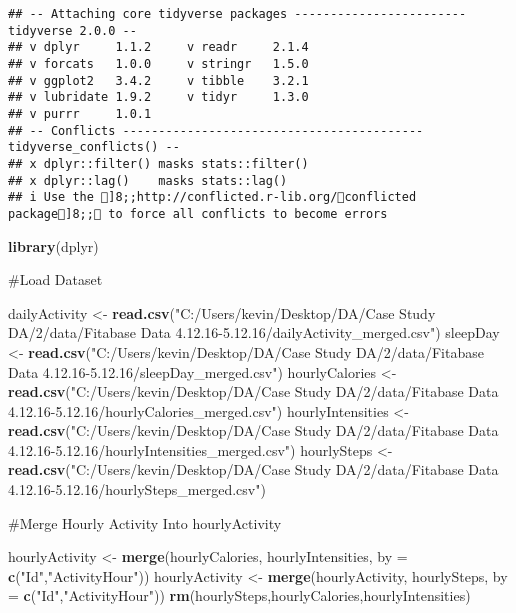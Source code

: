 \documentclass[
]{article}
\newenvironment{Shaded}{\begin{snugshade}}{\end{snugshade}}
\newcommand{\AttributeTok}[1]{\textcolor[rgb]{0.13,0.29,0.53}{#1}}
\newcommand{\FunctionTok}[1]{\textcolor[rgb]{0.13,0.29,0.53}{\textbf{#1}}}
\newcommand{\NormalTok}[1]{#1}
\newcommand{\OtherTok}[1]{\textcolor[rgb]{0.56,0.35,0.01}{#1}}
\newcommand{\StringTok}[1]{\textcolor[rgb]{0.31,0.60,0.02}{#1}}
\begin{document}
\begin{verbatim}
## -- Attaching core tidyverse packages ------------------------ tidyverse 2.0.0 --
## v dplyr     1.1.2     v readr     2.1.4
## v forcats   1.0.0     v stringr   1.5.0
## v ggplot2   3.4.2     v tibble    3.2.1
## v lubridate 1.9.2     v tidyr     1.3.0
## v purrr     1.0.1     
## -- Conflicts ------------------------------------------ tidyverse_conflicts() --
## x dplyr::filter() masks stats::filter()
## x dplyr::lag()    masks stats::lag()
## i Use the ]8;;http://conflicted.r-lib.org/conflicted package]8;; to force all conflicts to become errors
\end{verbatim}

\begin{Shaded}
\begin{Highlighting}[]
\FunctionTok{library}\NormalTok{(dplyr)}
\end{Highlighting}
\end{Shaded}

\#Load Dataset

\begin{Shaded}
\begin{Highlighting}[]
\NormalTok{dailyActivity }\OtherTok{\textless{}{-}} \FunctionTok{read.csv}\NormalTok{(}\StringTok{"C:/Users/kevin/Desktop/DA/Case Study DA/2/data/Fitabase Data 4.12.16{-}5.12.16/dailyActivity\_merged.csv"}\NormalTok{)}
\NormalTok{sleepDay }\OtherTok{\textless{}{-}} \FunctionTok{read.csv}\NormalTok{(}\StringTok{"C:/Users/kevin/Desktop/DA/Case Study DA/2/data/Fitabase Data 4.12.16{-}5.12.16/sleepDay\_merged.csv"}\NormalTok{)}
\NormalTok{hourlyCalories }\OtherTok{\textless{}{-}} \FunctionTok{read.csv}\NormalTok{(}\StringTok{"C:/Users/kevin/Desktop/DA/Case Study DA/2/data/Fitabase Data 4.12.16{-}5.12.16/hourlyCalories\_merged.csv"}\NormalTok{)}
\NormalTok{hourlyIntensities }\OtherTok{\textless{}{-}} \FunctionTok{read.csv}\NormalTok{(}\StringTok{"C:/Users/kevin/Desktop/DA/Case Study DA/2/data/Fitabase Data 4.12.16{-}5.12.16/hourlyIntensities\_merged.csv"}\NormalTok{)}
\NormalTok{hourlySteps }\OtherTok{\textless{}{-}} \FunctionTok{read.csv}\NormalTok{(}\StringTok{"C:/Users/kevin/Desktop/DA/Case Study DA/2/data/Fitabase Data 4.12.16{-}5.12.16/hourlySteps\_merged.csv"}\NormalTok{)}
\end{Highlighting}
\end{Shaded}

\#Merge Hourly Activity Into hourlyActivity

\begin{Shaded}
\begin{Highlighting}[]
\NormalTok{hourlyActivity }\OtherTok{\textless{}{-}} \FunctionTok{merge}\NormalTok{(hourlyCalories, hourlyIntensities, }\AttributeTok{by =} \FunctionTok{c}\NormalTok{(}\StringTok{"Id"}\NormalTok{,}\StringTok{"ActivityHour"}\NormalTok{))}
\NormalTok{hourlyActivity }\OtherTok{\textless{}{-}} \FunctionTok{merge}\NormalTok{(hourlyActivity, hourlySteps, }\AttributeTok{by =} \FunctionTok{c}\NormalTok{(}\StringTok{"Id"}\NormalTok{,}\StringTok{"ActivityHour"}\NormalTok{))}
\FunctionTok{rm}\NormalTok{(hourlySteps,hourlyCalories,hourlyIntensities)}
\end{Highlighting}
\end{Shaded}
\end{document}
